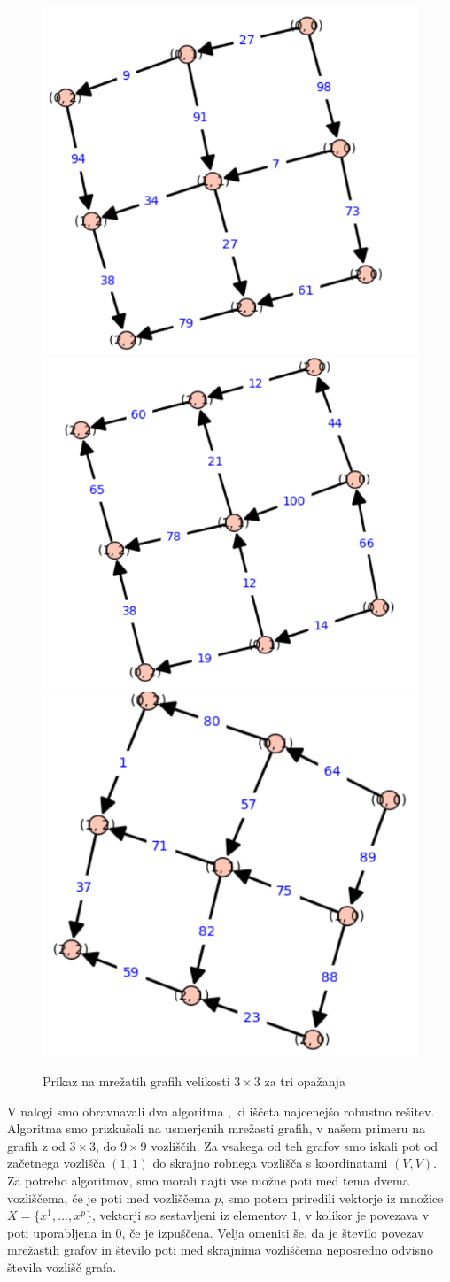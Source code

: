 \documentclass[a4paper, 12 pt]{article}
\theoremstyle{definition} %
\theoremstyle{plain} %
\theoremstyle{definition}
\begin{document}
\begin{figure}[H]
    \includegraphics[width=.5\textwidth]{prvi.png}\hfill
    \includegraphics[width=.5\textwidth]{drugi.png}\hfill
    \includegraphics[width=.5\textwidth]{tretji.png}\hfill
    \\[\smallskipamount]
    \caption{Prikaz na mrežatih grafih velikosti $3 \times 3$ za tri opažanja}\label{fig:foobar}
\end{figure}

  
V nalogi smo obravnavali dva algoritma , ki iščeta najcenejšo robustno rešitev. Algoritma smo prizkušali na usmerjenih mrežasti grafih, v našem primeru na grafih  z od $3\times3$, do $9\times9$ vozliščih. Za vsakega od teh grafov smo iskali pot od začetnega vozlišča $(1, 1)$ do skrajno robnega vozlišča s koordinatami $(V, V)$. Za potrebo algoritmov, smo morali najti vse možne poti med tema dvema vozliščema, če je poti med vozliščema $p$, smo potem priredili vektorje iz množice $X = \{x^1, \dots, x^p \}$, vektorji so sestavljeni iz elementov $1$, v kolikor je povezava v poti uporabljena in $0$, če je izpuščena. Velja omeniti še, da je število povezav mrežastih grafov in število poti med skrajnima vozliščema neposredno odvisno števila vozlišč grafa.\newline
\end{document}
